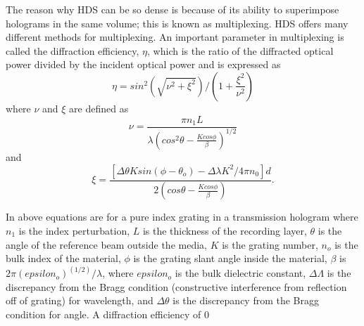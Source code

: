 \documentclass[ notitlepage, numerical, 11pt]{revtex4-1} %
\begin{document}
The reason why HDS can be so dense is because of its ability to superimpose holograms in the same volume; this is known as multiplexing. HDS offers many different methods for multiplexing. An important parameter in multiplexing is called the diffraction efficiency, $\eta$, which is the ratio of the diffracted optical power divided by the incident optical power and is expressed as 
\begin{equation}
\eta = sin^2(\sqrt{\nu ^2 + \xi ^2})/(1 + \frac{\xi ^2}{\nu ^2})
\label{dE}
\end{equation}
where $\nu$ and $\xi$ are defined as 
\begin{equation}
\nu = \frac{\pi n_1L}{\lambda(cos^2\theta - \frac{Kcos\phi}{\beta})^{1/2}}
\label{nu}
\end{equation}
and
\begin{equation}
\xi = \frac{[\Delta\theta K sin(\phi - \theta_o) - \Delta\lambda K^2 / 4\pi n_0]d}{2(cos\theta - \frac{Kcos\phi}{\beta})}.
\label{xi}
\end{equation}

In above equations are for a pure index grating in a transmission hologram where $n_1$ is the index perturbation, $L$ is the thickness of the recording layer, $\theta$ is the angle of the reference beam outside the media, $K$ is the grating number, $n_o$ is the bulk index of the material, $\phi$ is the grating slant angle inside the material, $\beta$ is $2\pi (epsilon_o)^(1/2)/\lambda$, where $epsilon_o$ is the bulk dielectric constant, $\Delta \Lambda$ is the discrepancy from the Bragg condition (constructive interference from reflection off of grating) for wavelength, and $\Delta \theta$ is the discrepancy from the Bragg condition for angle. A diffraction efficiency of 0%
\end{document}
